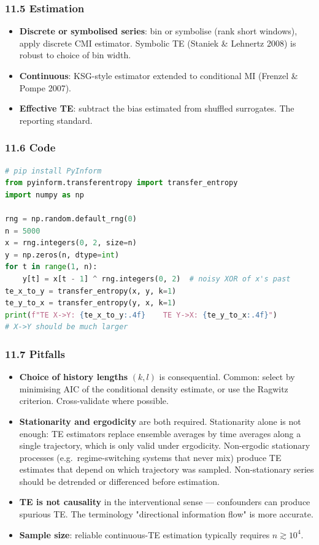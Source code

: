 \documentclass{article}
\providecommand{\tightlist}{\setlength{\itemsep}{0pt}\setlength{\parskip}{0pt}}
\begin{document}
\subsubsection{11.5 Estimation}\label{115-estimation}

\begin{itemize}
\tightlist
\item
  \textbf{Discrete or symbolised series}: bin or symbolise (rank short
  windows), apply discrete CMI estimator. Symbolic TE (Staniek \&
  Lehnertz 2008) is robust to choice of bin width.
\item
  \textbf{Continuous}: KSG-style estimator extended to conditional MI
  (Frenzel \& Pompe 2007).
\item
  \textbf{Effective TE}: subtract the bias estimated from shuffled
  surrogates. The reporting standard.
\end{itemize}

\subsubsection{11.6 Code}\label{116-code}

\begin{lstlisting}[language=Python]
# pip install PyInform
from pyinform.transferentropy import transfer_entropy
import numpy as np

rng = np.random.default_rng(0)
n = 5000
x = rng.integers(0, 2, size=n)
y = np.zeros(n, dtype=int)
for t in range(1, n):
    y[t] = x[t - 1] ^ rng.integers(0, 2)  # noisy XOR of x's past
te_x_to_y = transfer_entropy(x, y, k=1)
te_y_to_x = transfer_entropy(y, x, k=1)
print(f"TE X->Y: {te_x_to_y:.4f}    TE Y->X: {te_y_to_x:.4f}")
# X->Y should be much larger
\end{lstlisting}

\subsubsection{11.7 Pitfalls}\label{117-pitfalls}

\begin{itemize}
\tightlist
\item
  \textbf{Choice of history lengths} \((k, l)\) is consequential.
  Common: select by minimising AIC of the conditional density estimate,
  or use the Ragwitz criterion. Cross-validate where possible.
\item
  \textbf{Stationarity and ergodicity} are both required. Stationarity
  alone is not enough: TE estimators replace ensemble averages by
  time averages along a single trajectory, which is only valid under
  ergodicity. Non-ergodic stationary processes (e.g.\ regime-switching
  systems that never mix) produce TE estimates that depend on which
  trajectory was sampled. Non-stationary series should be detrended
  or differenced before estimation.
\item
  \textbf{TE is not causality} in the interventional sense ---
  confounders can produce spurious TE. The terminology "directional
  information flow" is more accurate.
\item
  \textbf{Sample size}: reliable continuous-TE estimation typically
  requires \(n \gtrsim 10^4\).
\end{itemize}
\end{document}
